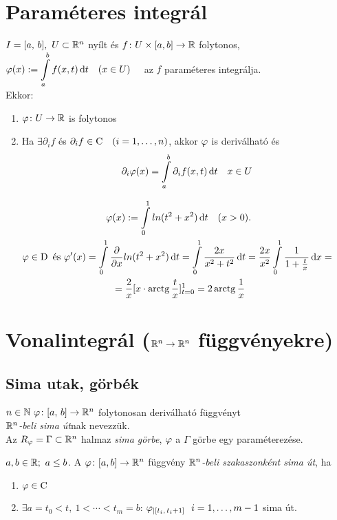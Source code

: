 \section{Paraméteres integrál}
\begin{te}
  $I=[a,\,b],\ U\subset \mathbb{R}^n$ nyílt és $f\colon U\times[a,b]\to\mathbb{R}$ folytonos,\\
  $\vfi(x) := \di\Int_a^bf(x,t) \diff t\quad(x\in U)\quad$ az $f$ paraméteres integrálja.\\
Ekkor:
{\listazjbetu
\begin{enumerate}
\item  $\varphi\colon U\to\mathbb{R}$ is folytonos
\item Ha $\exists \partial_if$ és $\partial_if\in \operatorname{C}\quad (i=1,\dotsc,n)$, akkor $\varphi$ is deriválható és
\begin{gather*} \di \partial_i\vfi(x) = \Int_a^b\partial_if(x,t)\diff t\quad x\in U\end{gather*}
\end{enumerate}
}
\end{te}
\begin{pl}
  \begin{gather*}
    \vfi(x) := \Int_0^1 ln(t^2+x^2) \diff t\quad(x>0).\\
    \vfi \in\Der \text{ és } \vfi'(x) = \Int_0^1\dfrac{\partial}{\partial x} ln(t^2+x^2) \diff t =
    \Int_0^1 \dfrac{2x}{x^2+t^2} \diff t= \dfrac{2x}{x^2}\Int_0^1 \dfrac1{1+\frac t x} \diff x = {}\\
	{}=\dfrac2x[x \cdot \arctg\dfrac t x]^1_{t=0} = 2 \arctg \dfrac1x
  \end{gather*}
\end{pl}
\newpage
\section{Vonalintegrál ($\mathbb{R}^n\to\mathbb{R}^n$ függvényekre)}
\subsection{Sima utak, görbék}
\begin{de}[Sima út]$n\in\mathbb{N}\ \varphi\colon[a,\,b]\to\mathbb{R}^n$ folytonosan deriválható függvényt\\\emph{$\mathbb{R}^n$-beli sima út}nak
    nevezzük.\\  Az $R_\varphi = \Gamma\subset\mathbb{R}^n$ halmaz \emph{sima görbe}, $\varphi$ a $\Gamma$ görbe egy paraméterezése.
\end{de}

\begin{de}$a,b\in\mathbb{R};\ a\leq b$. A $\varphi\colon[a,b]\to \mathbb{R}^n$ függvény  \emph{$\mathbb{R}^n$-beli
    szakaszonként sima út}, ha 
{\listazjromai
  \begin{enumerate}
  \item $\varphi\in\operatorname{C}$
  \item $\exists a=t_0<t,\ 1<\dotsb<t_m=b$: $\vfi_{|[t_i,\,t_i+1]}\ \ i=1,\dotsc,m-1$ sima út.
\end{enumerate}
}
\end{de}

